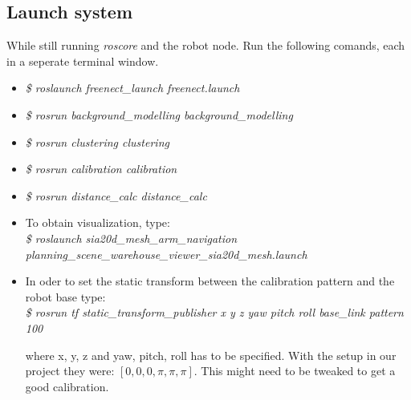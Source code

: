 \documentclass[10pt,a4paper]{article}
\begin{document}
\subsection{Launch system}
While still running \textit{roscore} and the robot node. Run the following comands, each in a seperate terminal window.
\begin{itemize}
\item \textit{\$ roslaunch freenect\_launch freenect.launch}

\item \textit{\$ rosrun background\_modelling background\_modelling}

\item \textit{\$ rosrun clustering clustering}

\item \textit{\$ rosrun calibration calibration}

\item \textit{\$ rosrun distance\_calc distance\_calc}

\item To obtain visualization, type:\\
\textit{\$ roslaunch sia20d\_mesh\_arm\_navigation planning\_scene\_warehouse\_viewer\_sia20d\_mesh.launch}

\item In oder to set the static transform between the calibration pattern and the robot base type:\\
 \textit{\$ rosrun tf static\_transform\_publisher x y z yaw pitch roll base\_link pattern 100}
 
where x, y, z and yaw, pitch, roll has to be specified. With the setup in our project they were: $\left[0, 0, 0, \pi, \pi, \pi \right].$ This might need to be tweaked to get a good calibration.
\end{itemize}
\end{document}
